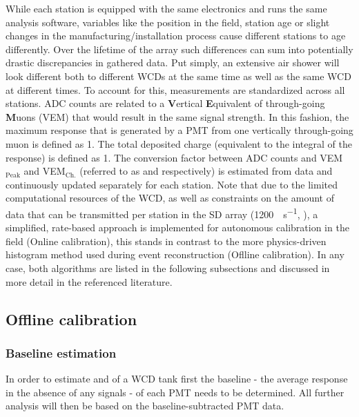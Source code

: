 While each station is equipped with the same electronics and runs the same analysis software, variables like the position in the field, station age or slight 
changes in the manufacturing/installation process cause different stations to age differently. Over the lifetime of the array such differences can sum into 
potentially drastic discrepancies in gathered data. Put simply, an extensive air shower will look different both to different WCDs at the same time as well as 
the same WCD at different times. To account for this, measurements are standardized across all stations. ADC counts are related to a \textbf{V}ertical 
\textbf{E}quivalent of through-going \textbf{M}uons (VEM) that would result in the same signal strength. In this fashion, the maximum response that is generated 
by a PMT from one vertically through-going muon is defined as \SI{1}{\Peak}. The total deposited charge (equivalent to the integral of the response) is defined 
as \SI{1}{\Charge}. The conversion factor between ADC counts and VEM$_\text{Peak}$ and VEM$_\text{Ch.}$ (referred to as \Ipeak and \Qpeak respectively) is 
estimated from data and continuously updated separately for each station. Note that due to the limited computational resources of the WCD, as well as constraints
on the amount of data that can be transmitted per station in the SD array (\SI{1200}{\bit\per\second}, \cite{localStationCalib}), a simplified, rate-based approach 
is implemented for autonomous calibration in the field (Online calibration), this stands in contrast to the more physics-driven histogram method used during event 
reconstruction (Oflline calibration). In any case, both algorithms are listed in the following subsections and discussed in more detail in the referenced 
literature.

\subsection{Offline calibration}
\label{ssec:offline-calibration}

\subsubsection{Baseline estimation}
\label{sssec:offline-baseline-estimation}

In order to estimate \Ipeak and \Qpeak of a WCD tank first the baseline - the average response in the absence of any signals - of each PMT needs to be determined. 
All further analysis will then be based on the baseline-subtracted PMT data.

